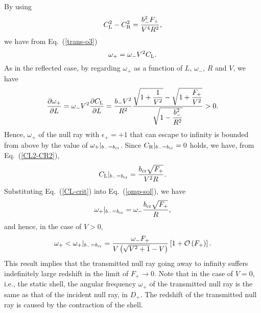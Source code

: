 \documentclass[aps,preprint,preprintnumber,nofootinbib,amsmath,amssymb,ascmac,bm,12pt]{revtex4}
\newcommand{\omp}{\omega_+}
\newcommand{\omm}{\omega_-}
\newcommand{\bpu}{b_+}
\newcommand{\bmi}{b_-}
\begin{document}
By using
\begin{equation}
C_{\rm L}^2 - C_{\rm R}^2 = \frac{b_-^2F_+}{V^4 R^2},  \label{CL2-CR2}
\end{equation}
we have from Eq.~(\ref{trans-o3}) 
\begin{equation}
\omp=\omm V^2 C_{\rm L}.  \label{omp-sol}
\end{equation}
As in the reflected case, by regarding $\omp$ as a function of $L$, $\omm$, $R$ and $V$, 
we have
$$
\frac{\partial \omp}{\partial L}=\omm V^2 \frac{\partial C_{\rm L}}{\partial L}
=\frac{\bmi V^2}{R^2}\frac{\sqrt{1+\dfrac{1}{V^2}}-\sqrt{1+\dfrac{F_+}{V^2}}}
{\sqrt{{1-\dfrac{\bmi^2}{R^2}}}}>0.
$$ 
Hence, $\omp$ of the null ray with $\epsilon_+=+1$ that can escape to infinity is 
bounded from above by the value of $\omp|_{\bmi=b_{\rm cr}}$. 
Since $C_{\rm R}|_{\bmi=b_{\rm cr}}=0$ holds, we have, from Eq.~(\ref{CL2-CR2}), 
\begin{equation}
C_{\rm L}|_{\bmi=b_{\rm cr}}=\frac{b_{\rm cr}\sqrt{F_+}}{V^2 R}. \label{CL-crit}
\end{equation}
Substituting Eq.~(\ref{CL-crit}) into Eq.~(\ref{omp-sol}), we have
$$
\omp|_{\bmi=b_{\rm cr}}
=\omm \frac{b_{\rm cr}\sqrt{F_+}}{R},
$$
and hence, in the case of $V>0$, 
$$
\omp<\omp|_{\bmi=b_{\rm cr}}
=\frac{\omm F_+}{V\left(\sqrt{V^2+1}-V\right)}\left[1+{\cal O}\left(F_+\right)\right].
$$
This result implies that the transmitted null ray going away to infinity suffers indefinitely large 
redshift in the limit of $F_+\rightarrow0$.   
Note that in the case of $V=0$, i.e., the static shell, the angular frequency $\omega_+$ 
of the transmitted null ray is the same as that of the incident null ray, in $D_+$. 
The redshift of the transmitted null ray is caused by the contraction of the shell. 


\end{document}
